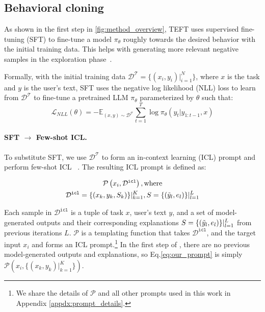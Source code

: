 \subsection{Behavioral cloning}
\label{sec:behavioral_cloning}

As shown in the first step in \autoref{fig:method_overview}, TEFT uses supervised fine-tuning (SFT) to fine-tune a model $\pi_\theta$ roughly towards the desired behavior with the initial training data.
This helps with generating more relevant negative samples in the exploration phase~\cite{song-etal-2024-trial}. 

Formally, with the initial training data $\mathcal{D}^\mathcal{T}=\{(x_i,y_i)|_{i=1}^N\}$, where $x$ is the task and $y$ is the user's text, SFT uses the negative log likelihood (NLL) loss to learn from $\mathcal{D}^{\mathcal{T}}$ to fine-tune a pretrained LLM $\pi_\theta$ parameterized by $\theta$ such that: 
$$\mathcal{L}_{NLL}(\theta)=-\mathbb{E}_{(x,y)\sim\mathcal{D}^{\mathcal{T}}}\sum\limits_{t=1}^T\log\pi_{\theta}(y_t|y_{1:t-1},x)$$

\paragraph{SFT $\rightarrow$ Few-shot ICL.} 
To substitute SFT, we use $\mathcal{D}^{\mathcal{T}}$ to form an in-context learning (ICL) prompt and perform few-shot ICL ~\cite{tom2020fewshot}.
The resulting ICL prompt is defined as: 

\small
\begin{multline}
    \mathcal{P}\left(x_i,
    \mathcal{D}^{\texttt{icl}}\right),  \text{where} \\  \mathcal{D}^{\texttt{icl}} = \{(x_k,y_k,S_k)\}|_{k=1}^K, S = \{(\Tilde{y}_l, e_l)\}|_{l=1}^L
    \label{eq:our_prompt}
\end{multline}
\normalsize


Each sample in $\mathcal{D}^{\texttt{icl}}$ is a tuple of task $x$, user's text $y$, and a set of model-generated outputs and their corresponding explanations $S=\{(\Tilde{y}_{l}, e_{l})\}|_{l=1}^L$ from previous iterations $L$.  
$\mathcal{P}$ is a templating function that takes $\mathcal{D}^{\texttt{icl}}$, and the target input $x_i$ and forms an ICL prompt.\footnote{We share the details of $\mathcal{P}$ and all other prompts used in this work in Appendix \ref{appdx:prompt_details}.} 
In the first step of \ours, there are no previous model-generated outputs and explanations, so Eq.\ref{eq:our_prompt} is simply 
$\mathcal{P}\left(x_i,\{(x_k,y_k)|_{k=1}^K\}\right)$.


